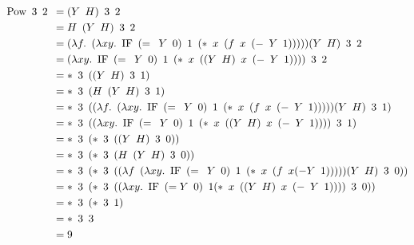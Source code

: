 \begin{align*}
	\text{Pow} \enskip  3 \enskip 2 \enskip &= (Y\enskip H) \enskip 3 \enskip 2
	\\&= H \enskip (Y\enskip H) \enskip 3 \enskip 2
	\\&= (\lambda f. \enskip (\lambda xy. \enskip \text{IF} \enskip (= \enskip Y \enskip 0) \enskip 1 \enskip (* \enskip x \enskip (f \enskip x \enskip (- \enskip Y \enskip 1)))))(Y\enskip H) \enskip 3 \enskip 2
	\\&= (\lambda xy. \enskip \text{IF} \enskip (= \enskip Y \enskip 0) \enskip 1 \enskip (* \enskip x \enskip ((Y \enskip H) \enskip x \enskip (- \enskip Y \enskip 1)))) \enskip 3 \enskip 2
	\\&= * \enskip 3 \enskip ((Y \enskip H) \enskip 3 \enskip 1)
	\\&= * \enskip 3 \enskip (H \enskip (Y \enskip H) \enskip 3 \enskip 1)
	\\&= * \enskip 3 \enskip ((\lambda f. \enskip (\lambda xy. \enskip \text{IF} \enskip (= \enskip Y \enskip 0) \enskip 1 \enskip (* \enskip x \enskip (f \enskip x \enskip (- \enskip Y \enskip 1)))))(Y \enskip H) \enskip 3 \enskip 1)
	\\&= * \enskip 3 \enskip ((\lambda xy. \enskip \text{IF} \enskip (= \enskip Y \enskip 0) \enskip 1 \enskip (* \enskip x \enskip ((Y\enskip H)\enskip x\enskip (- \enskip Y \enskip 1)))) \enskip 3 \enskip 1)
	\\&= * \enskip 3 \enskip (* \enskip 3 \enskip ((Y \enskip H)\enskip 3 \enskip 0))
	\\&= * \enskip 3 \enskip (* \enskip 3 \enskip (H\enskip (Y \enskip H) \enskip 3 \enskip 0))
	\\&= * \enskip 3 \enskip (* \enskip 3 \enskip ((\lambda f \enskip (\lambda xy. \enskip \text{IF} \enskip (= \enskip Y \enskip 0)\enskip 1\enskip (* \enskip x\enskip (f \enskip x(-Y \enskip 1)))))(Y \enskip H)\enskip 3 \enskip 0))
	\\&= * \enskip 3 \enskip (* \enskip 3 \enskip ((\lambda xy. \enskip \text{IF} \enskip (=Y \enskip 0) \enskip 1(* \enskip x \enskip ((Y \enskip H)\enskip x\enskip (- \enskip Y \enskip 1))))\enskip 3 \enskip 0))
	\\&= * \enskip 3 \enskip (* \enskip 3 \enskip 1)
	\\&= * \enskip 3 \enskip 3
	\\&= 9
\end{align*}
